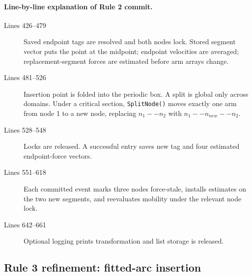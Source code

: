 \documentclass[11pt]{article}
\newcommand{\code}[1]{\texorpdfstring{\nolinkurl{#1}}{#1}}
\begin{document}
\paragraph{Line-by-line explanation of Rule 2 commit.}
\begin{description}
\item[Lines 426--479] Saved endpoint tags are resolved and both nodes lock.
Stored segment vector puts the point at the midpoint; endpoint velocities are
averaged; replacement-segment forces are estimated before arm arrays change.
\item[Lines 481--526] Insertion point is folded into the periodic box. A split
is global only across domains. Under a critical section,
\code{SplitNode()} moves exactly one arm from node 1 to a new node, replacing
\(n_1--n_2\) with \(n_1--n_{new}--n_2\).
\item[Lines 528--548] Locks are released. A successful entry saves new tag
and four estimated endpoint-force vectors.
\item[Lines 551--618] Each committed event marks three nodes force-stale,
installs estimates on the two new segments, and reevaluates mobility under
the relevant node lock.
\item[Lines 642--661] Optional logging prints transformation and list storage
is released.
\end{description}

\subsection{Rule 3 refinement: fitted-arc insertion}


\end{document}
